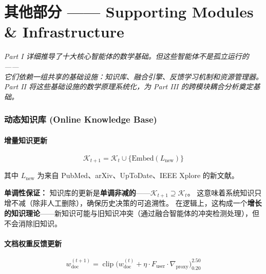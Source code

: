 \documentclass[11pt,a4paper]{ctexart}
\theoremstyle{remark}
\DeclareMathOperator{\clip}{clip}
\begin{document}
\part{其他部分 —— Supporting Modules \& Infrastructure}

\vspace{6pt}
\begin{center}
\small
\textit{Part I 详细推导了十大核心智能体的数学基础。但这些智能体不是孤立运行的——}\\
\textit{它们依赖一组共享的基础设施：知识库、融合引擎、反馈学习机制和资源管理器。}\\
\textit{Part II 将这些基础设施的数学原理系统化，为 Part III 的跨模块耦合分析奠定基础。}
\end{center}
\vspace{12pt}

\section{动态知识库 (Online Knowledge Base)}

\subsection{增量知识更新}

\begin{equation}
\mathcal{K}_{t+1} = \mathcal{K}_t \cup \{\text{Embed}(L_{\text{new}})\}
\end{equation}

其中 $L_{\text{new}}$ 为来自 PubMed、arXiv、UpToDate、IEEE Xplore 的新文献。

\textbf{单调性保证：} 知识库的更新是\textbf{单调非减的}——$\mathcal{K}_{t+1} \supseteq \mathcal{K}_t$。
这意味着系统知识只增不减（除非人工删除），确保历史决策的可追溯性。
在逻辑上，这构成一个\textbf{增长的知识理论}——新知识可能与旧知识冲突（通过融合智能体的冲突检测处理），但不会消除旧知识。

\subsection{文档权重反馈更新}

\begin{equation}
w_{\text{doc}}^{(t+1)} = \clip\Big(w_{\text{doc}}^{(t)} + \eta \cdot F_{\text{user}} \cdot \nabla_{\text{proxy}}\Big)_{0.20}^{2.50}
\label{eq:weight_update}
\end{equation}
\end{document}
